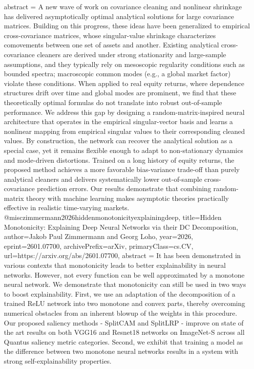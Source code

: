 {      abstract = {A new wave of work on covariance cleaning and nonlinear shrinkage has delivered asymptotically optimal analytical solutions for large covariance matrices. Building on this progress, these ideas have been generalized to empirical cross-covariance matrices, whose singular-value shrinkage characterizes comovements between one set of assets and another. Existing analytical cross-covariance cleaners are derived under strong stationarity and large-sample assumptions, and they typically rely on mesoscopic regularity conditions such as bounded spectra; macroscopic common modes (e.g., a global market factor) violate these conditions. When applied to real equity returns, where dependence structures drift over time and global modes are prominent, we find that these theoretically optimal formulas do not translate into robust out-of-sample performance. We address this gap by designing a random-matrix-inspired neural architecture that operates in the empirical singular-vector basis and learns a nonlinear mapping from empirical singular values to their corresponding cleaned values. By construction, the network can recover the analytical solution as a special case, yet it remains flexible enough to adapt to non-stationary dynamics and mode-driven distortions. Trained on a long history of equity returns, the proposed method achieves a more favorable bias-variance trade-off than purely analytical cleaners and delivers systematically lower out-of-sample cross-covariance prediction errors. Our results demonstrate that combining random-matrix theory with machine learning makes asymptotic theories practically effective in realistic time-varying markets.}
}@misc{zimmermann2026hiddenmonotonicityexplainingdeep,
      title={Hidden Monotonicity: Explaining Deep Neural Networks via their DC Decomposition}, 
      author={Jakob Paul Zimmermann and Georg Loho},
      year={2026},
      eprint={2601.07700},
      archivePrefix={arXiv},
      primaryClass={cs.CV},
      url={https://arxiv.org/abs/2601.07700},
      abstract = {It has been demonstrated in various contexts that monotonicity leads to better explainability in neural networks. However, not every function can be well approximated by a monotone neural network. We demonstrate that monotonicity can still be used in two ways to boost explainability. First, we use an adaptation of the decomposition of a trained ReLU network into two monotone and convex parts, thereby overcoming numerical obstacles from an inherent blowup of the weights in this procedure. Our proposed saliency methods - SplitCAM and SplitLRP - improve on state of the art results on both VGG16 and Resnet18 networks on ImageNet-S across all Quantus saliency metric categories. Second, we exhibit that training a model as the difference between two monotone neural networks results in a system with strong self-explainability properties.}
}
